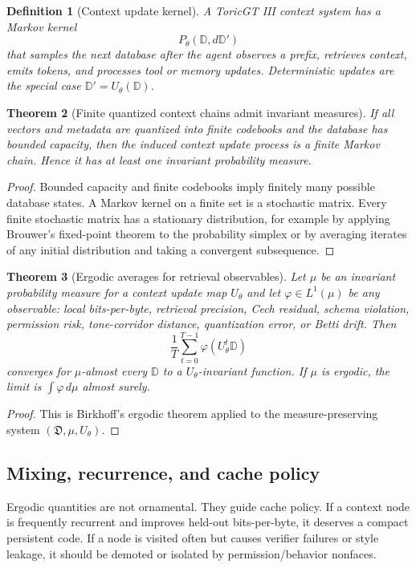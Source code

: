 \documentclass[11pt]{article}
\newtheorem{theorem}{Theorem}[section]
\newtheorem{definition}[theorem]{Definition}
\numberwithin{equation}{section}
\begin{document}
\begin{definition}[Context update kernel]
A ToricGT III context system has a Markov kernel
\begin{equation}
P_\theta(\mathbb{D},d\mathbb{D}')
\end{equation}
that samples the next database after the agent observes a prefix, retrieves context, emits tokens, and processes tool or memory updates. Deterministic updates are the special case $\mathbb{D}'=U_\theta(\mathbb{D})$.
\end{definition}

\begin{theorem}[Finite quantized context chains admit invariant measures]
If all vectors and metadata are quantized into finite codebooks and the database has bounded capacity, then the induced context update process is a finite Markov chain. Hence it has at least one invariant probability measure.
\end{theorem}
\begin{proof}
Bounded capacity and finite codebooks imply finitely many possible database states. A Markov kernel on a finite set is a stochastic matrix. Every finite stochastic matrix has a stationary distribution, for example by applying Brouwer's fixed-point theorem to the probability simplex or by averaging iterates of any initial distribution and taking a convergent subsequence.
\end{proof}

\begin{theorem}[Ergodic averages for retrieval observables]
Let $\mu$ be an invariant probability measure for a context update map $U_\theta$ and let $\varphi\in L^1(\mu)$ be any observable: local bits-per-byte, retrieval precision, Cech residual, schema violation, permission risk, tone-corridor distance, quantization error, or Betti drift. Then
\begin{equation}
\frac1T\sum_{t=0}^{T-1}\varphi(U_\theta^t\mathbb{D})
\end{equation}
converges for $\mu$-almost every $\mathbb{D}$ to a $U_\theta$-invariant function. If $\mu$ is ergodic, the limit is $\int\varphi\,d\mu$ almost surely.
\end{theorem}
\begin{proof}
This is Birkhoff's ergodic theorem applied to the measure-preserving system $(\mathfrak{D},\mu,U_\theta)$.
\end{proof}

\subsection{Mixing, recurrence, and cache policy}
Ergodic quantities are not ornamental. They guide cache policy. If a context node is frequently recurrent and improves held-out bits-per-byte, it deserves a compact persistent code. If a node is visited often but causes verifier failures or style leakage, it should be demoted or isolated by permission/behavior nonfaces.
\end{document}

